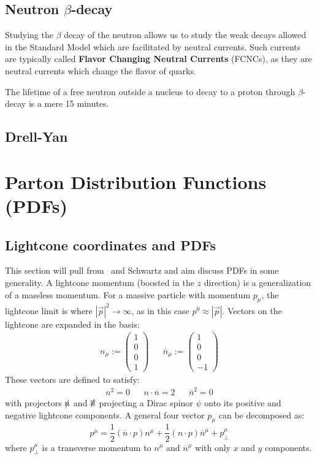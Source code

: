 \documentclass[11pt, oneside]{article}   	%
\theoremstyle{definition}
\begin{document}
\subsection{Neutron $\beta$-decay}

Studying the $\beta$ decay of the neutron allows us to study the weak decays allowed in the Standard Model which are facilitated by 
neutral currents. Such currents are typically called \textbf{Flavor Changing Neutral Currents} (FCNCs), as they are neutral currents 
which change the flavor of quarks. 

The lifetime of a free neutron outside a nucleus to decay to a proton through $\beta$-decay is a mere 15 minutes. 

\subsection{Drell-Yan}


\newpage
\section{Parton Distribution Functions (PDFs)}

\subsection{Lightcone coordinates and PDFs}

This section will pull from~\cite{pdfs} and Schwartz and aim discuss PDFs in some generality. A lightcone momentum (boosted 
in the $z$ direction) is a generalization of a massless momentum. For a massive particle with momentum $p_\mu$, the 
lightcone limit is where $|\vec p|^2\rightarrow\infty$, as in this case $p^0\approx |\vec p|$. Vectors on the lightcone are expanded 
in the basis:
\begin{align}
	n_\mu := \begin{pmatrix} 1 \\ 0 \\ 0 \\ 1 \end{pmatrix} && \overline{n}_\mu := \begin{pmatrix} 1 \\ 0 \\ 0 \\ -1 \end{pmatrix}
\end{align}
These vectors are defined to satisfy:
\begin{align}
	n^2 = 0 && n\cdot \overline{n} = 2 && \overline{n}^2 = 0
\end{align}
with projectors $\slashed{n}$ and $\slashed{\overline{n}}$ projecting a Dirac spinor $\psi$ onto its positive and negative 
lightcone components. A general four vector $p_\mu$ can be decomposed as:
\begin{equation}
	p^\mu = \frac{1}{2}(\overline n\cdot p) n^\mu + \frac{1}{2} (n\cdot p)\overline{n}^\mu + p_\perp^\mu
\end{equation}
where $p_\perp^\mu$ is a transverse momentum to $n^\mu$ and $\overline{n}^\mu$ with only $x$ and $y$ components. 
\end{document}
